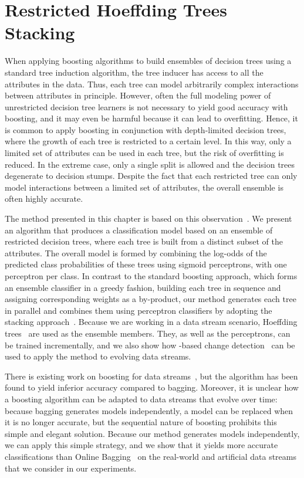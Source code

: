 \chapter{Restricted Hoeffding Trees Stacking}
\label{ch:stacking}
When applying boosting algorithms to build ensembles of decision trees
using a standard tree induction algorithm, the tree inducer has access
to all the attributes in the data. Thus, each tree can model
arbitrarily complex interactions between attributes in
principle. However, often the full modeling power of unrestricted
decision tree learners is not necessary to yield good accuracy with
boosting, and it may even be harmful because it can lead to
overfitting. Hence, it is common to apply boosting in conjunction with
depth-limited decision trees, where the growth of each tree is
restricted to a certain level. In this way, only a limited set of
attributes can be used in each tree, but the risk of overfitting is
reduced. In the extreme case, only a single split is allowed and the
decision trees degenerate to decision stumps. Despite the fact that
each restricted tree can only model interactions between a limited set
of attributes, the overall ensemble is often highly accurate.

The method presented in this chapter is based on this observation~\cite{BifetFHP10}. We
present an algorithm that produces a classification model based on an
ensemble of restricted decision trees, where each tree is built from a
distinct subset of the attributes. The overall model is formed by
combining the log-odds of the predicted class probabilities of these trees using sigmoid perceptrons, with one perceptron per class. In contrast to the standard boosting approach,
which forms an ensemble classifier in a greedy fashion, building each tree in
sequence and assigning corresponding weights as a by-product, our
method generates each tree in parallel and combines them using perceptron classifiers by adopting the stacking approach~\cite{stacking}. Because we
are working in a data stream scenario, Hoeffding trees~\cite{vfdt} are
used as the ensemble members. They, as well as the perceptrons,
can be trained incrementally, and we also show how \adwinb-based change
detection~\cite{bif-gav} can be used to apply the method to evolving data
streams.

There is existing work on boosting for data streams~\cite{ozabagboost}, but
the algorithm has been found to yield inferior accuracy compared to
\adwin bagging. Moreover, it is unclear how a boosting algorithm can be
adapted to data streams that evolve over time: because bagging
generates models independently, a model can be replaced when it is no
longer accurate, but the sequential nature of boosting prohibits this
simple and elegant solution. Because our method generates models
independently, we can apply this simple strategy, and we show that it yields
more accurate classifications than Online Bagging~\cite{ozabagboost} on the real-world and
artificial data streams that we consider in our experiments.


